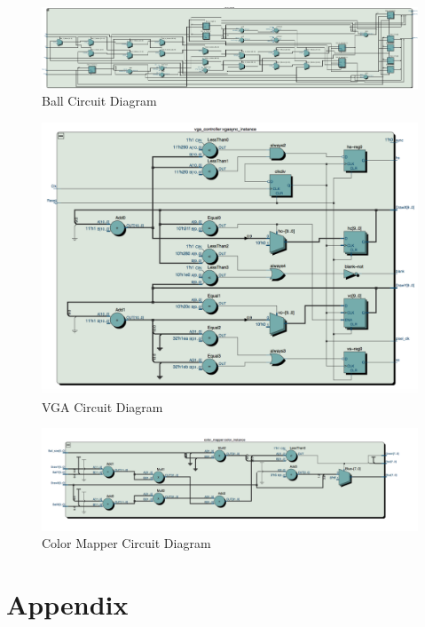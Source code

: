 \documentclass[journal, twocolumn, final,11pt,letterpaper]{IEEEtran}
\begin{document}
\begin{figure} [H]
	\centering
	\includegraphics[scale=1]{ball_diagram.pdf}
	\caption{Ball Circuit Diagram\label{fig:ball}}
\end{figure}

\begin{figure} [H]
	\centering
	\includegraphics[scale=.5]{vga_diagram.png}
	\caption{VGA Circuit Diagram\label{fig:vga}}
\end{figure}

\begin{figure} [H]
	\centering
	\includegraphics[scale=.5]{color_mapper_diagram.png}
	\caption{Color Mapper Circuit Diagram\label{fig:color_mapper}}
\end{figure}            

     

\section*{Appendix}
\end{document}
